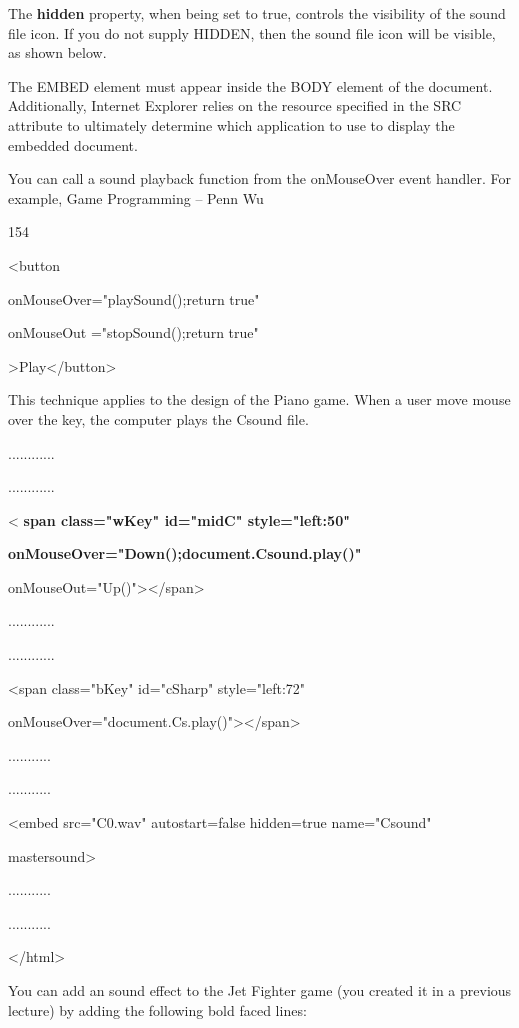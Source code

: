 \documentclass[
]{article}
\begin{document}
The \textbf{hidden} property, when being set to true, controls the
visibility of the sound file icon. If you do not supply HIDDEN, then the
sound file icon will be visible, as shown below.

The EMBED element must appear inside the BODY element of the document.
Additionally, Internet Explorer relies on the resource specified in the
SRC attribute to ultimately determine which application to use to
display the embedded document.

You can call a sound playback function from the onMouseOver event
handler. For example, Game Programming -- Penn Wu

154

\protect\hypertarget{index_split_010.htmlux5cux23p155}{}{}\textless button

onMouseOver="playSound();return true"

onMouseOut ="stopSound();return true"

\textgreater Play\textless/button\textgreater{}

This technique applies to the design of the Piano game. When a user move
mouse over the key, the computer plays the Csound file.

............

............

\textless{} \textbf{span class="wKey" id="midC" style="left:50"}

\textbf{onMouseOver="Down();document.Csound.play()"}

onMouseOut="Up()"\textgreater\textless/span\textgreater{}

............

............

\textless span class="bKey" id="cSharp" style="left:72"

onMouseOver="document.Cs.play()"\textgreater\textless/span\textgreater{}

...........

...........

\textless embed src="C0.wav" autostart=false hidden=true name="Csound"

mastersound\textgreater{}

...........

...........

\textless/html\textgreater{}

You can add an sound effect to the Jet Fighter game (you created it in a
previous lecture) by adding the following bold faced lines:
\end{document}
